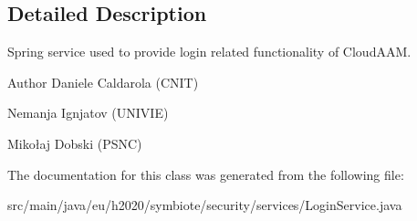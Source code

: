 \subsection{Detailed Description}
Spring service used to provide login related functionality of Cloud\+A\+AM.

\begin{DoxyAuthor}{Author}
Daniele Caldarola (C\+N\+IT) 

Nemanja Ignjatov (U\+N\+I\+V\+IE) 

Mikołaj Dobski (P\+S\+NC) 
\end{DoxyAuthor}


The documentation for this class was generated from the following file\+:\begin{DoxyCompactItemize}
\item 
src/main/java/eu/h2020/symbiote/security/services/Login\+Service.\+java\end{DoxyCompactItemize}
